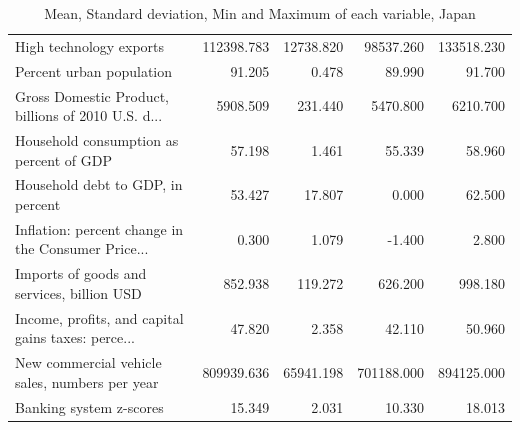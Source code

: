 \documentclass[11pt]{article}
\begin{document}
\begin{table}[H]
\begin{tabular}{lrrrr}
High technology exports                            &  112398.783 &  12738.820 &   98537.260 &  133518.230 \\
Percent urban population                           &      91.205 &      0.478 &      89.990 &      91.700 \\
Gross Domestic Product, billions of 2010 U.S. d... &    5908.509 &    231.440 &    5470.800 &    6210.700 \\
Household consumption as percent of GDP            &      57.198 &      1.461 &      55.339 &      58.960 \\
Household debt to GDP, in percent                  &      53.427 &     17.807 &       0.000 &      62.500 \\
Inflation: percent change in the Consumer Price... &       0.300 &      1.079 &      -1.400 &       2.800 \\
Imports of goods and services, billion USD         &     852.938 &    119.272 &     626.200 &     998.180 \\
Income, profits, and capital gains taxes: perce... &      47.820 &      2.358 &      42.110 &      50.960 \\
New commercial vehicle sales, numbers per year     &  809939.636 &  65941.198 &  701188.000 &  894125.000 \\
Banking system z-scores                            &      15.349 &      2.031 &      10.330 &      18.013 \\
\bottomrule
\end{tabular}
\caption{Mean, Standard deviation, Min and Maximum of each variable, Japan}
\label{tab:describe_jpn}
\end{table}
\end{document}
